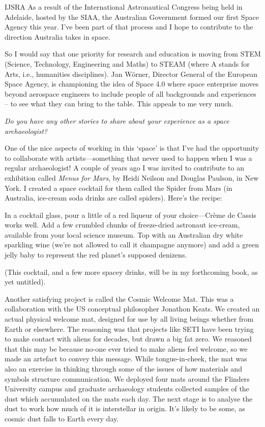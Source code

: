 \begin{labeling}{IJSRA}
	As a result of the International Astronautical Congress being held in Adelaide, hosted by the SIAA, the Australian Government formed our first Space Agency this year. I’ve been part of that process and I hope to contribute to the direction Australia takes in space.

	So I would say that one priority for research and education is moving from STEM (Science, Technology, Engineering and Maths) to STEAM (where A stands for Arts, i.e., humanities disciplines). Jan Wörner, Director General of the European Space Agency, is championing the idea of Space 4.0 where space enterprise moves beyond aerospace engineers to include people of all backgrounds and experiences – to see what they can bring to the table. This appeals to me very much.

	\item[IJSRA] \emph{Do you have any other stories to share about your experience as a space archaeologist?}

	\item[AG] One of the nice aspects of working in this ‘space’ is that I’ve had the opportunity to collaborate with artists—something that never used to happen when I was a regular archaeologist! A couple of years ago I was invited to contribute to an exhibition called \emph{Menus for Mars}, by Heidi Neilson and Douglas Paulson, in New York. I created a space cocktail for them called the Spider from Mars (in Australia, ice-cream soda drinks are called spiders). Here’s the recipe:

	In a cocktail glass, pour a little of a red liqueur of your choice—Crème de Cassis works well. Add a few crumbled chunks of freeze-dried astronaut ice-cream, available from your local science museum. Top with an Australian dry white sparkling wine (we’re not allowed to call it champagne anymore) and add a green jelly baby to represent the red planet’s supposed denizens.

	(This cocktail, and a few more spacey drinks, will be in my forthcoming book, as yet untitled).

	Another satisfying project is called the Cosmic Welcome Mat. This was a collaboration with the US conceptual philosopher Jonathon Keats. We created an actual physical welcome mat, designed for use by all living beings whether from Earth or elsewhere. The reasoning was that projects like SETI have been trying to make contact with aliens for decades, but drawn a big fat zero. We reasoned that this may be because no-one ever tried to make aliens feel welcome, so we made an artefact to convey this message. While tongue-in-cheek, the mat was also an exercise in thinking through some of the issues of how materials and symbols structure communication. We deployed four mats around the Flinders University campus and graduate archaeology students collected samples of the dust which accumulated on the mats each day. The next stage is to analyse the dust to work how much of it is interstellar in origin. It’s likely to be some, as cosmic dust falls to Earth every day.


\end{labeling}
